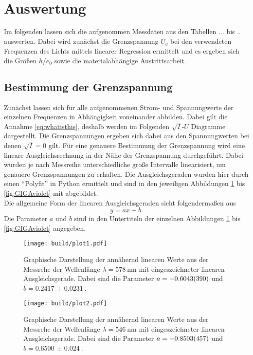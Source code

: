 \section{Auswertung}

Im folgenden lassen sich die aufgenommen Messdaten aus den Tabellen ... bis .. auswerten. Dabei wird zunächst die Grenzspannung $U_{g}$ bei den verwendeten Frequenzen des Lichts mittels linearer Regression ermittelt und es ergeben sich
die Größen $h$/$e_{0}$ sowie die materialabhängige Austrittsarbeit.

\subsection{Bestimmung der Grenzspannung}

Zunächst lassen sich für alle aufgenommenen Strom- und Spannungwerte der einzelnen Frequenzen in Abhängigkeit voneinander abbilden. Dabei gilt die Annahme \eqref{eq:whatisthis}, deshalb werden im Folgenden $\sqrt{I}$-$U$ Diagramme dargestellt.
Die Grenzspannungen ergeben sich dabei aus den Spannungwerten bei denen $\sqrt{I} = 0$ gilt.
Für eine genauere Bestimmung der Grenzspannung wird eine lineare Ausgleichsrechnung in der Nähe der Grenzspannung durchgeführt.  Dabei wurden je nach Messreihe unterschiedliche große
Intervalle linearisiert, um genauere Grenzspannungen zu erhalten. 
Die Ausgleichsgeraden wurden hier durch einen \enquote{Polyfit} in Python \cite{python} ermittelt und sind in den jeweiligen Abbildungen \ref{fig:gelb} bis \ref{fig:GIGAviolet} mit abgebildet.
\\
Die allgemeine Form der linearen Ausgleichsgeraden sieht folgendermaßen aus
\begin{equation}
    \label{eqn:okay}
y = ax + b.
\end{equation}
Die Parameter $a$ und $b$ sind in den Untertiteln der einzelnen Abbildungen \ref{fig:gelb} bis \ref{fig:GIGAviolet} angegeben.

\newpage

\begin{figure}
    \centering
    \texttt{[image: build/plot1.pdf]}
    \caption{Graphische Darstellung der annähernd linearen Werte aus der Messrehe der Wellenlänge $\lambda = \SI{578}{\nano\meter}$ mit eingeszeichneter linearen Ausgleichsgerade. Dabei sind die Parameter $\protect a = \SI{-0.6043(390)}{}$ und $b = \SI{0.2417(231)}{}$.} 
    \label{fig:gelb}
\end{figure}

\begin{figure}
    \centering
    \texttt{[image: build/plot2.pdf]}
    \caption{Graphische Darstellung der annähernd linearen Werte aus der Messrehe der Wellenlänge $\lambda = \SI{546}{\nano\meter}$ mit eingeszeichneter linearen Ausgleichsgerade. Dabei sind die Parameter $\protect a = \SI{-0.8503(457)}{}$ und $b = \SI{0.6500(240)}{}$.} 
    \label{fig:grün}
\end{figure}

